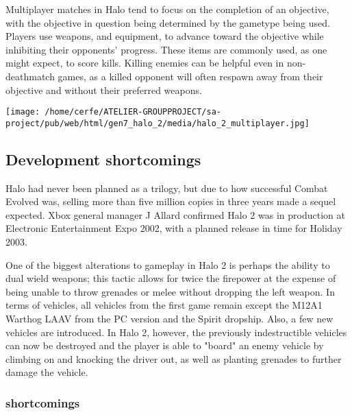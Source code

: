 \documentclass[a4paper,10pt]{book}
\begin{document}
 
          Multiplayer matches in Halo tend to focus on the completion of an objective, with the objective in question being determined by the gametype being used. Players use weapons, and equipment, to advance toward the objective while inhibiting their opponents' progress.
          These items are commonly used, as one might expect, to score kills.  Killing enemies can be helpful even in non-deathmatch games, as a killed opponent will often respawn away from their objective and without their preferred weapons.
         
 \texttt{[image: /home/cerfe/ATELIER-GROUPPROJECT/sa-project/pub/web/html/gen7\_halo\_2/media/halo\_2\_multiplayer.jpg]}
 \subsection{Development  shortcomings }
 
          Halo had never been planned as a trilogy, but due to how successful  Combat Evolved was, selling more than five million copies in three years made a sequel expected. Xbox general manager J Allard confirmed Halo 2 was in production at Electronic Entertainment Expo 2002,
          with a planned release in time for Holiday 2003.
         
 
          One of the biggest alterations to gameplay in Halo 2 is perhaps the ability to dual wield weapons; this tactic allows for twice the firepower at the expense of being unable to throw grenades or melee without dropping the left weapon. 
          In terms of vehicles, all vehicles from the first game remain except the M12A1 Warthog LAAV from the PC version and the Spirit dropship. Also, a few new vehicles are introduced. In Halo 2, however,
          the previously indestructible vehicles can now be destroyed and the player is able to "board" an enemy vehicle by climbing on and knocking the driver out, as well as planting grenades to further damage the vehicle.
         
 
 \subsubsection{shortcomings }
 
\end{document}
